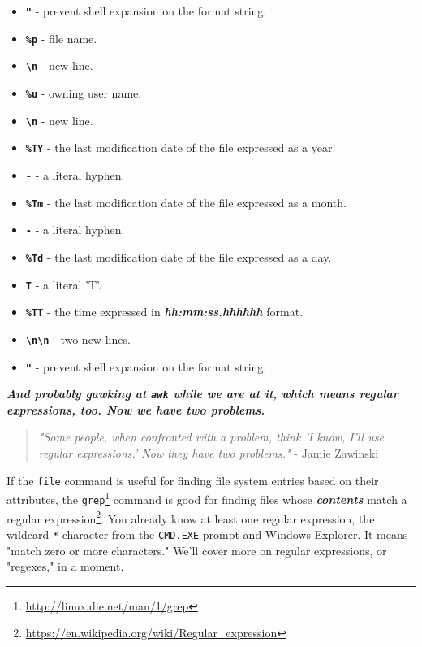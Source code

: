 \documentclass[10pt,]{book}
\renewcommand{\href}[2]{#2\footnote{\url{#1}}}
\numberwithin{figure}{chapter}
\DeclareRobustCommand{\drcmd}[1]{\index{Commands!#1}}
\DeclareRobustCommand{\drshl}[1]{\index{Shells!#1}}
\begin{document}
\begin{itemize}
\itemsep1pt\parskip0pt
\item
  \textbf{\texttt{"}} - prevent shell expansion on the format string.
\item
  \textbf{\texttt{\%p}} - file name.
\item
  \textbf{\texttt{\textbackslash{}n}} - new line.
\item
  \textbf{\texttt{\%u}} - owning user name.
\item
  \textbf{\texttt{\textbackslash{}n}} - new line.
\item
  \textbf{\texttt{\%TY}} - the last modification date of the file
  expressed as a year.
\item
  \textbf{\texttt{-}} - a literal hyphen.
\item
  \textbf{\texttt{\%Tm}} - the last modification date of the file
  expressed as a month.
\item
  \textbf{\texttt{-}} - a literal hyphen.
\item
  \textbf{\texttt{\%Td}} - the last modification date of the file
  expressed as a day.
\item
  \textbf{\texttt{T}} - a literal 'T'.
\item
  \textbf{\texttt{\%TT}} - the time expressed in
  \textbf{\emph{hh:mm:ss.hhhhhh}} format.
\item
  \textbf{\texttt{\textbackslash{}n\textbackslash{}n}} - two new lines.
\item
  \textbf{\texttt{"}} - prevent shell expansion on the format string.
\end{itemize}


\textbf{\emph{And probably gawking at \texttt{awk} while we are at it,
which means regular expressions, too. Now we have two problems.}}

\begin{quote}
\emph{"Some people, when confronted with a problem, think 'I know, I'll
use regular expressions.' Now they have two problems."} - Jamie Zawinski
\end{quote}

If the \texttt{file} command is useful for finding file system entries
based on their attributes, the
\href{http://linux.die.net/man/1/grep}{\texttt{grep}}\drcmd{grep}
command is good for finding files whose \textbf{\emph{contents}} match a
\href{https://en.wikipedia.org/wiki/Regular_expression}{regular
expression}. You already know at least one
regular expression, the wildcard \texttt{*} character from the
\texttt{CMD.EXE}\drshl{CMD.EXE} prompt and Windows Explorer. It means
"match zero or more characters." We'll cover more on regular
expressions, or "regexes," in a moment.
\end{document}
